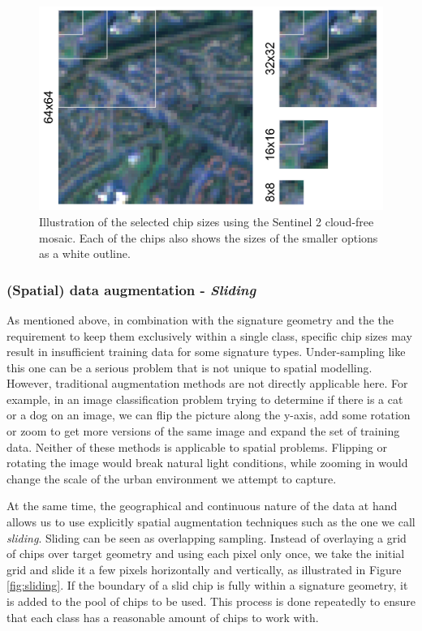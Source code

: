 \documentclass[]{interact}
\theoremstyle{plain}%
\theoremstyle{definition}
\theoremstyle{remark}
\begin{document}
\begin{figure}
    \centering
    \includegraphics[width=.8\linewidth]{fig/chips.png}
    \caption{Illustration of the selected chip sizes using the Sentinel 2 cloud-free mosaic. Each of the chips also shows the sizes of the smaller options as a white outline.}
    \label{fig:chips}
\end{figure}



\subsubsection{(Spatial) data augmentation - \textit{Sliding}}



As mentioned above, in combination with the signature
geometry and the
the requirement to keep them exclusively within a single class, specific chip sizes may result in
insufficient training data for some signature types. Under-sampling like this
one can be a serious problem that is not unique to spatial modelling. However,
traditional augmentation methods are not directly applicable here. For example, in an
image classification problem trying to determine if there is a cat or a dog on an image,
we can flip the picture along the y-axis, add some rotation or zoom to get more versions of
the same image and expand the set of training data. Neither of these methods is
applicable to spatial problems. Flipping or rotating the image would break
natural light conditions, while zooming in would change the scale of the urban environment
we attempt to capture.

At the same time, the geographical and continuous nature of the data at hand
allows us to use explicitly spatial augmentation techniques such as the one we
call \textit{sliding}.
Sliding can be seen as overlapping sampling. Instead of overlaying a grid of chips over
target geometry and using each pixel only once, we take the initial grid and slide it a
few pixels horizontally and vertically, as illustrated in Figure \ref{fig:sliding}. If
the boundary of a slid chip is fully within a signature geometry, it is added to the
pool of chips to be used. This process is done repeatedly to ensure that each class has
a reasonable amount of chips to work with.
\end{document}
